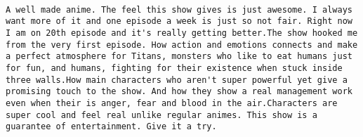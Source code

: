 \documentclass[
]{article}
\begin{document}
\begin{verbatim}
                                                                                                                                                                                                                                                                                                                                                                                                                                                                                                                                                                                                                                                                                                                                                                                                                                                                                                                                                                                                                                                                                                                                                                                                                                                                                                                                                                                                                                                                                                                                                                                                                                                                                                                                                                                                                                                                                                                                                                                                                                                                                                                                                                                                                                                                                                                                                                                                                                                                                                    A well made anime. The feel this show gives is just awesome. I always want more of it and one episode a week is just so not fair. Right now I am on 20th episode and it's really getting better.The show hooked me from the very first episode. How action and emotions connects and make a perfect atmosphere for Titans, monsters who like to eat humans just for fun, and humans, fighting for their existence when stuck inside three walls.How main characters who aren't super powerful yet give a promising touch to the show. And how they show a real management work even when their is anger, fear and blood in the air.Characters are super cool and feel real unlike regular animes. This show is a guarantee of entertainment. Give it a try.

\end{verbatim}
\end{document}
